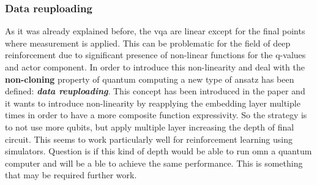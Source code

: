 \subsubsection{Data reuploading}
As it was already explained before, the \acrlong{vqa} are linear except for the final points where measurement is applied. This can be problematic for the field of deep reinforcement due to significant presence of non-linear functions for the q-values and actor component. In order to introduce this non-linearity and deal with the \textbf{non-cloning} property of quantum computing a new type of ansatz has been defined: \textit{\textbf{data reuploading}}.
This concept has been introduced in the paper \cite{P_rez_Salinas_2020} and it wants to introduce non-linearity by reapplying the embedding layer multiple times in order to have a more composite function expressivity. So the strategy is to not use more qubits, but apply multiple layer increasing the depth of final circuit. This seems to work particularly well for reinforcement learning using simulators. Question is if this kind of depth would be able to run omn a quantum computer and will be a ble to achieve the same performance. This is something that may be required further work.
